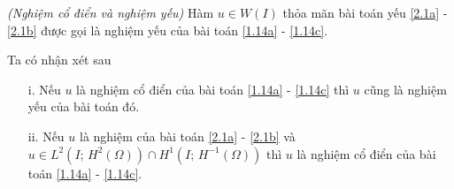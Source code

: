 \documentclass[]{article}
\begin{document}
\begin{dn}{\textit{(Nghiệm cổ điển và nghiệm yếu)}}\label{dn2.2}
	Hàm $u\in W(I)$ thỏa mãn bài toán yếu \eqref{2.1a} - \eqref{2.1b} được gọi là nghiệm yếu của bài toán \eqref{1.14a} - \eqref{1.14c}. 
\end{dn}
\begin{nx}Ta có nhận xét sau
	\begin{itemize}
		\item[i.] Nếu $u$ là nghiệm cổ điển của bài toán \eqref{1.14a} - \eqref{1.14c} thì $u$ cũng là nghiệm yếu của bài toán đó.
		\item[ii.] Nếu $u$ là nghiệm của bài toán \eqref{2.1a} - \eqref{2.1b} và $u\in L^2\left(I;\, H^2(\Omega)\right)\cap H^1\left(I;\, H^{-1}(\Omega)\right)$ thì $u$ là nghiệm cổ điển của bài toán \eqref{1.14a} - \eqref{1.14c}.
	\end{itemize}
\end{nx}
\end{document}
